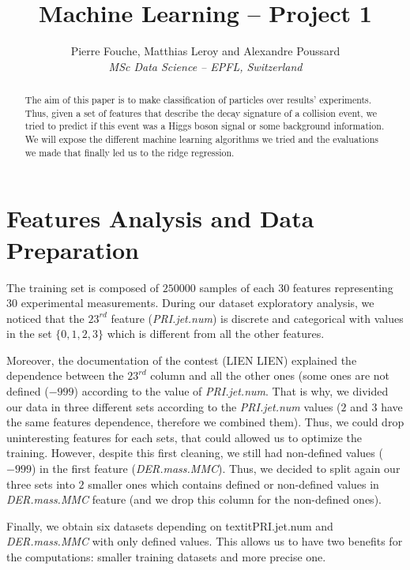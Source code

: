\documentclass[10pt,conference,compsocconf]{IEEEtran}
\begin{document}
\title{Machine Learning -- Project 1}

\author{
  Pierre Fouche, Matthias Leroy and Alexandre Poussard\\
  \textit{MSc Data Science -- EPFL, Switzerland}
}

\maketitle

\begin{abstract}
  The aim of this paper is to make classification of particles over results' experiments. Thus, given a set of features that describe the decay signature of a collision event, we tried to predict if this event was a Higgs boson signal or some background information. We will expose the different machine learning algorithms we tried and the evaluations we made that finally led us to the ridge regression.
\end{abstract}

\section{Features Analysis and Data Preparation}

The training set is composed of $250 000$ samples of each $30$ features representing $30$ experimental measurements. During our dataset exploratory analysis, we noticed that the $23^{rd}$ feature (\textit{PRI.jet.num}) is discrete and categorical with values in the set $\{0,1,2,3\}$ which is different from all the other features. 

Moreover, the documentation of the contest (LIEN LIEN) explained the dependence between the $23^{rd}$ column and all the other ones (some ones are not defined ($-999$) according to the value of \textit{PRI.jet.num}. That is why, we divided our data in three different sets according to the \textit{PRI.jet.num} values ($2$ and $3$ have the same features dependence, therefore we combined them). Thus, we could drop uninteresting features for each sets, that could allowed us to optimize the training. However, despite this first cleaning, we still had non-defined values ($-999$) in the first feature (\textit{DER.mass.MMC}). Thus, we decided to split again our three sets into $2$ smaller ones which contains defined or non-defined values in \textit{DER.mass.MMC} feature (and we drop this column for the non-defined ones).

Finally, we obtain six datasets depending on textit{PRI.jet.num} and \textit{DER.mass.MMC} with only defined values. This allows us to have two benefits for the computations: smaller training datasets and more precise one. \\
\end{document}
